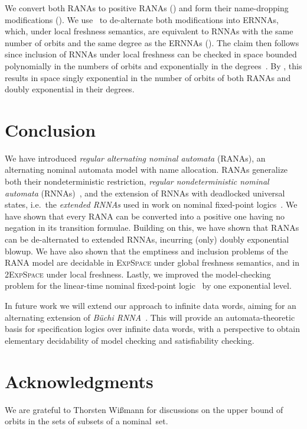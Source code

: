 \documentclass[10pt,a4paper]{amsart}
\theoremstyle{definition}
\renewcommand{\textsf}[1]{{\oldtextsf{\small#1}}}
\newcommand{\muBar}{\mbox{\textsf{Bar-$\mu$TL}}\xspace}
\newcommand{\EXPSPACE}{\textsc{ExpSpace}\xspace}
\begin{document}
\begin{IEEEproof}
  We convert both RANAs to positive RANAs
  ()
  and form their name-dropping modifications
  ().  We use~ to
  de-alternate both modifications into ERNNAs, which, under local
  freshness semantics, are equivalent to RNNAs with the same number of
  orbits and the same degree as the ERNNAs (\cite[Rem.~5.2]{hms21}). The
  claim then follows since %
  inclusion of RNNAs under local
  freshness can be checked in space bounded polynomially in the numbers
  of orbits and exponentially in the degrees~\cite[Cor.~7.4]{skmw17}. By
  , this results in space singly
  exponential in the number of orbits of both RANAs and doubly
  exponential in their degrees.
\end{IEEEproof}




\section{Conclusion}\label{sec:concl}

We have introduced \emph{regular alternating nominal automata}
  (RANAs), an alternating nominal automata model with name
allocation. RANAs generalize both their nondeterministic restriction,
\emph{regular nondeterministic nominal automata} (\mbox{RNNAs})~\cite{skmw17}, and the extension of RNNAs with deadlocked
universal states, i.e.~the \emph{extended RNNAs }used in work on
nominal fixed-point logics~\cite{hms21}.  We have shown that every
RANA can be converted into a positive one having no negation in its
transition formulae. Building on this, we have shown that
RANAs can be de-alternated to extended RNNAs, incurring (only)
doubly exponential blowup.  We have also shown that the emptiness and
inclusion problems of the RANA model are decidable in
\EXPSPACE under global freshness semantics, and in
2\EXPSPACE under local freshness. Lastly, we improved the
model-checking problem for the linear-time nominal fixed-point logic
\muBar~by one exponential level.

In future work we will extend our approach to infinite data words, aiming for an
alternating extension of \emph{Büchi RNNA}~\cite{uhms21}. This will provide an
automata-theoretic basis for specification logics over infinite data words, with a perspective to
obtain elementary decidability of model checking and satisfiability checking.

\section*{Acknowledgments}
We are grateful to Thorsten Wißmann for discussions on the upper bound of orbits in the sets of subsets of a nominal~set.
\end{document}
